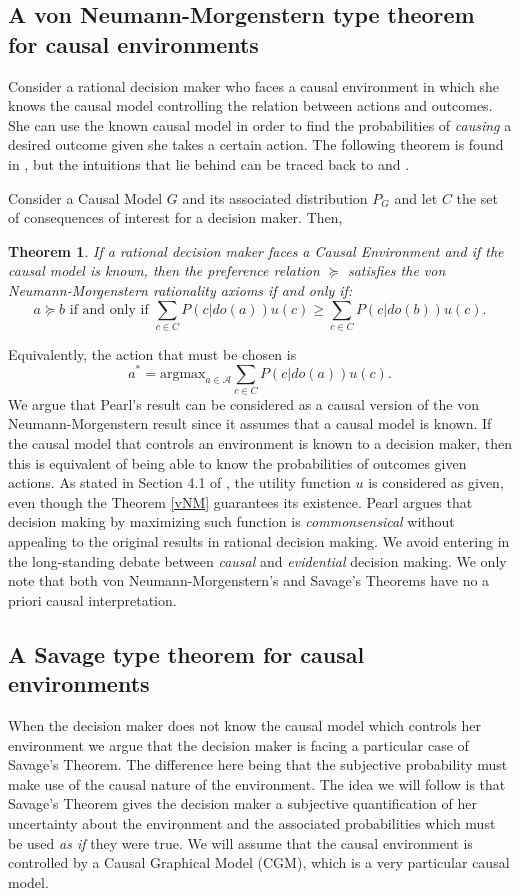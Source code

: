 \documentclass{article}
\theoremstyle{plain}
\newtheorem{teo}{Theorem}
\begin{document}
\subsection{A von Neumann-Morgenstern type theorem for causal environments}
Consider a rational decision maker who faces a causal environment in which she knows the causal model controlling the relation between actions and outcomes. She can use the known causal model in order to find the probabilities of \textit{causing} a desired outcome given she takes a certain action. The following theorem is found in \cite{pearl2009causality}, but the intuitions that lie behind can be traced back to \cite{lewis1981causal} and \cite{joyce1999foundations}.

Consider a Causal Model $G$ and its associated distribution $P_G$ and let $C$ the set of consequences of interest for a decision maker. Then,
\begin{teo}
If a rational decision maker faces a Causal Environment and if the causal model is known, then the preference relation $\succeq$ satisfies the von Neumann-Morgenstern rationality axioms if and only if:
\begin{equation} 
a \succeq b \textrm{ if and only if } \sum_{c \in C} P(c | do(a))u(c) \geq \sum_{c \in C} P(c | do(b))u(c).
\end{equation}
\end{teo}
Equivalently, the action that must be chosen is 
\[ a^\ast = \textrm{argmax}_{a \in \mathcal{A}} \sum_{c \in C} P(c | do(a))u(c). \]
We argue that Pearl's result can be considered as a causal version of the von Neumann-Morgenstern result since it assumes that a causal model is known. If the causal model that controls an environment is known to a decision maker, then this is equivalent of being able to know the probabilities of outcomes given actions. As stated in Section 4.1 of \cite{pearl2009causality}, the utility function $u$ is considered as given, even though the Theorem \ref{vNM} guarantees its existence. Pearl argues that decision making by maximizing such function is \textit{commonsensical} without appealing to the original results in rational decision making. We avoid entering in the long-standing debate between \textit{causal} and \textit{evidential} decision making. We only note that both von Neumann-Morgenstern's and Savage's Theorems have no a priori causal interpretation.
\subsection{A Savage type theorem for causal environments}{\label{section_savage}}
When the decision maker does not know the causal model which controls her environment we argue that the decision maker is facing a particular case of Savage's Theorem. The difference here being that the subjective probability must make use of the causal nature of the environment. The idea we will follow is that Savage's Theorem gives the decision maker a subjective quantification of her uncertainty about the environment and the associated probabilities which must be used \textit{as if} they were true. We will assume that the causal environment is controlled by a Causal Graphical Model (CGM), which is a very particular causal model.
\end{document}
